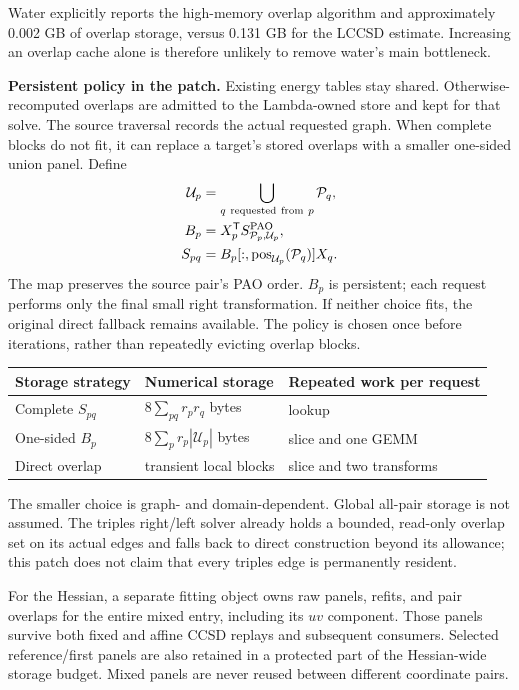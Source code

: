 \documentclass[10pt,letterpaper]{article}
\newcommand{\T}{^{\mathsf T}}
\begin{document}
Water explicitly reports the high-memory overlap algorithm and approximately 0.002 GB of overlap storage, versus 0.131 GB for the LCCSD estimate. Increasing an overlap cache alone is therefore unlikely to remove water's main bottleneck.

\textbf{Persistent policy in the patch.} Existing energy tables stay shared. Otherwise-recomputed overlaps are admitted to the Lambda-owned store and kept for that solve. The source traversal records the actual requested graph. When complete blocks do not fit, it can replace a target's stored overlaps with a smaller one-sided union panel. Define
\begin{align}
\mathcal U_p&=\bigcup_{q\ \mathrm{requested\ from}\ p}\mathcal P_q,\\
B_p&=X_p\T S^{\rm PAO}_{\mathcal P_p,\mathcal U_p},\\
S_{pq}&=B_p[:,\operatorname{pos}_{\mathcal U_p}(\mathcal P_q)]X_q.
\end{align}
The map preserves the source pair's PAO order. $B_p$ is persistent; each request performs only the final small right transformation. If neither choice fits, the original direct fallback remains available. The policy is chosen once before iterations, rather than repeatedly evicting overlap blocks.

\begin{center}\begin{tabular}{lll}\toprule
Storage strategy & Numerical storage & Repeated work per request\\\midrule
Complete $S_{pq}$ & $8\sum_{pq}r_pr_q$ bytes & lookup\\
One-sided $B_p$ & $8\sum_p r_p|\mathcal U_p|$ bytes & slice and one GEMM\\
Direct overlap & transient local blocks & slice and two transforms\\\bottomrule
\end{tabular}\end{center}
The smaller choice is graph- and domain-dependent. Global all-pair storage is not assumed. The triples right/left solver already holds a bounded, read-only overlap set on its actual edges and falls back to direct construction beyond its allowance; this patch does not claim that every triples edge is permanently resident.

For the Hessian, a separate fitting object owns raw panels, refits, and pair overlaps for the entire mixed entry, including its $uv$ component. Those panels survive both fixed and affine CCSD replays and subsequent consumers. Selected reference/first panels are also retained in a protected part of the Hessian-wide storage budget. Mixed panels are never reused between different coordinate pairs.
\end{document}
